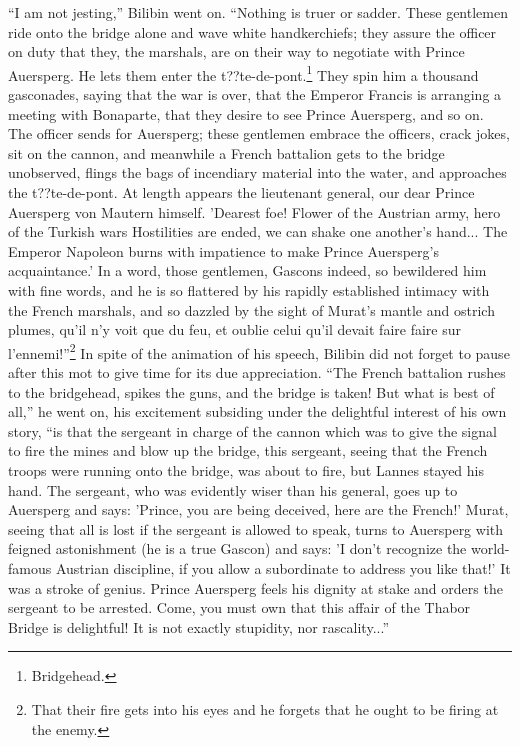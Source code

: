``I am not jesting,'' Bilibin went on. ``Nothing is truer or
sadder. These gentlemen ride onto the bridge alone and wave white
handkerchiefs; they assure the officer on duty that they, the
marshals, are on their way to negotiate with Prince Auersperg. He
lets them enter the t??te-de-pont.\footnote{Bridgehead.}  They
spin him a thousand gasconades, saying that the war is over, that
the Emperor Francis is arranging a meeting with Bonaparte, that
they desire to see Prince Auersperg, and so on. The officer sends
for Auersperg; these gentlemen embrace the officers, crack jokes,
sit on the cannon, and meanwhile a French battalion gets to the
bridge unobserved, flings the bags of incendiary material into
the water, and approaches the t??te-de-pont. At length appears the
lieutenant general, our dear Prince Auersperg von Mautern
himself. 'Dearest foe! Flower of the Austrian army, hero of the
Turkish wars Hostilities are ended, we can shake one another's
hand... The Emperor Napoleon burns with impatience to make Prince
Auersperg's acquaintance.' In a word, those gentlemen, Gascons
indeed, so bewildered him with fine words, and he is so flattered
by his rapidly established intimacy with the French marshals, and
so dazzled by the sight of Murat's mantle and ostrich plumes,
qu'il n'y voit que du feu, et oublie celui qu'il devait faire
faire sur l'ennemi!''\footnote{That their fire gets into his eyes
and he forgets that he ought to be firing at the enemy.} In spite
of the animation of his speech, Bilibin did not forget to pause
after this mot to give time for its due appreciation.  ``The
French battalion rushes to the bridgehead, spikes the guns, and
the bridge is taken! But what is best of all,'' he went on, his
excitement subsiding under the delightful interest of his own
story, ``is that the sergeant in charge of the cannon which was
to give the signal to fire the mines and blow up the bridge, this
sergeant, seeing that the French troops were running onto the
bridge, was about to fire, but Lannes stayed his hand. The
sergeant, who was evidently wiser than his general, goes up to
Auersperg and says: 'Prince, you are being deceived, here are the
French!' Murat, seeing that all is lost if the sergeant is
allowed to speak, turns to Auersperg with feigned astonishment
(he is a true Gascon) and says: 'I don't recognize the
world-famous Austrian discipline, if you allow a subordinate to
address you like that!' It was a stroke of genius. Prince
Auersperg feels his dignity at stake and orders the sergeant to
be arrested. Come, you must own that this affair of the Thabor
Bridge is delightful! It is not exactly stupidity, nor
rascality...''

